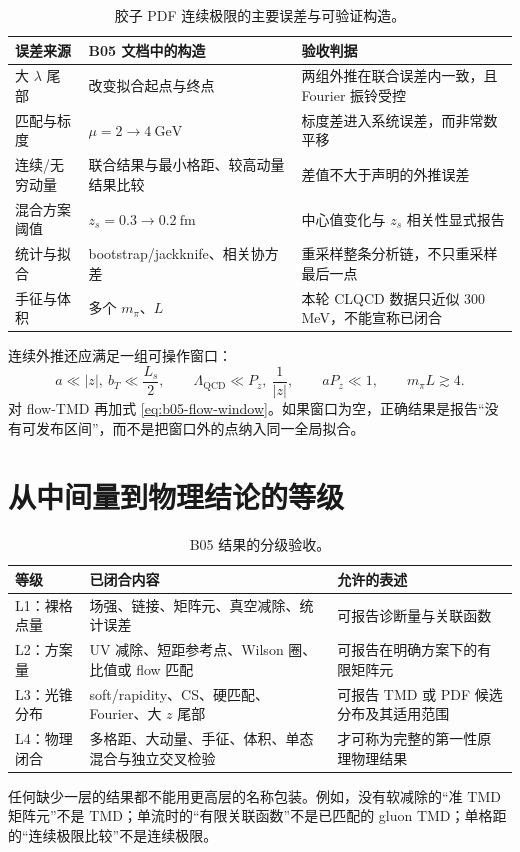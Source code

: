 \begin{table}[H]
  \centering
  \caption{胶子 PDF 连续极限的主要误差与可验证构造。}
  \label{tab:b05-continuum-errors}
  \small
  \begin{tabularx}{\textwidth}{@{}p{}p{}X@{}}
    \toprule
    误差来源 & B05 文档中的构造 & 验收判据 \\
    \midrule
    大 \(\lambda\) 尾部 & 改变拟合起点与终点 & 两组外推在联合误差内一致，且 Fourier 振铃受控 \\
    匹配与标度 & \(\mu=2\to4\ \mathrm{GeV}\) & 标度差进入系统误差，而非常数平移 \\
    连续/无穷动量 & 联合结果与最小格距、较高动量结果比较 & 差值不大于声明的外推误差 \\
    混合方案阈值 & \(z_s=0.3\to0.2\ \mathrm{fm}\) & 中心值变化与 \(z_s\) 相关性显式报告 \\
    统计与拟合 & bootstrap/jackknife、相关协方差 & 重采样整条分析链，不只重采样最后一点 \\
    手征与体积 & 多个 \(m_\pi\)、\(L\) & 本轮 CLQCD 数据只近似 300 MeV，不能宣称已闭合 \\
    \bottomrule
  \end{tabularx}
\end{table}

连续外推还应满足一组可操作窗口：
\begin{equation}
  a\ll |z|,\ b_T\ll \frac{L_s}{2},
  \qquad
  \Lambda_{\mathrm{QCD}}\ll P_z,\ \frac{1}{|z|},
  \qquad
  aP_z\ll1,
  \qquad
  m_\pi L\gtrsim4.
  \label{eq:b05-scale-windows}
\end{equation}
对 flow-TMD 再加式 \eqref{eq:b05-flow-window}。如果窗口为空，正确结果是报告“没有可发布区间”，而不是把窗口外的点纳入同一全局拟合。
\section{从中间量到物理结论的等级}

\begin{table}[H]
  \centering
  \caption{B05 结果的分级验收。}
  \label{tab:b05-claim-levels}
  \small
  \begin{tabularx}{\textwidth}{@{}p{}p{}X@{}}
    \toprule
    等级 & 已闭合内容 & 允许的表述 \\
    \midrule
    L1：裸格点量 & 场强、链接、矩阵元、真空减除、统计误差 & 可报告诊断量与关联函数 \\
    L2：方案量 & UV 减除、短距参考点、Wilson 圈、比值或 flow 匹配 & 可报告在明确方案下的有限矩阵元 \\
    L3：光锥分布 & soft/rapidity、CS、硬匹配、Fourier、大 \(z\) 尾部 & 可报告 TMD 或 PDF 候选分布及其适用范围 \\
    L4：物理闭合 & 多格距、大动量、手征、体积、单态混合与独立交叉检验 & 才可称为完整的第一性原理物理结果 \\
    \bottomrule
  \end{tabularx}
\end{table}

任何缺少一层的结果都不能用更高层的名称包装。例如，没有软减除的“准 TMD 矩阵元”不是 TMD；单流时的“有限关联函数”不是已匹配的 gluon TMD；单格距的“连续极限比较”不是连续极限。
